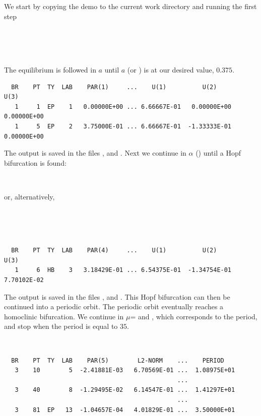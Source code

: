 \documentclass[12pt]{report}
\begin{document}
We start by copying the demo to the current work directory 
and running the first step
\begin{center}
\\
 \\
 \\
\end{center}
The equilibrium is followed in $a$ until $a$ (or ) is at our
desired value, $0.375$.
\begin{verbatim}
  BR    PT  TY  LAB    PAR(1)     ...    U(1)          U(2)          U(3)     
   1     1  EP    1   0.00000E+00 ... 6.66667E-01   0.00000E+00   0.00000E+00
   1     5  EP    2   3.75000E-01 ... 6.66667E-01  -1.33333E-01   0.00000E+00
\end{verbatim}
The output is saved in the files ,  and
.
Next we continue in $\alpha$ () until a Hopf bifurcation is
found:
\begin{center}
\\
\end{center}
or, alternatively,
\begin{center}
\\
\\
\\
\end{center}
\begin{verbatim}
  BR    PT  TY  LAB    PAR(4)     ...    U(1)          U(2)          U(3)     
   1     6  HB    3   3.18429E-01 ... 6.54375E-01  -1.34754E-01   7.70102E-02
\end{verbatim}
The output is saved in the files ,  and
.
This Hopf bifurcation can then be continued into a periodic orbit. The
periodic orbit eventually reaches a homoclinic bifurcation. We
continue in $\mu$= and , 
which corresponds to the period, and stop when the period is equal to $35$.
\begin{center}
 \\
\end{center}
\begin{verbatim}
  BR    PT  TY  LAB    PAR(5)        L2-NORM    ...    PERIOD    
   3    10        5  -2.41881E-03   6.70569E-01 ...  1.08975E+01
                                                ...
   3    40        8  -1.29495E-02   6.14547E-01 ...  1.41297E+01
                                                ...
   3    81  EP   13  -1.04657E-04   4.01829E-01 ...  3.50000E+01
\end{verbatim}
\end{document}
